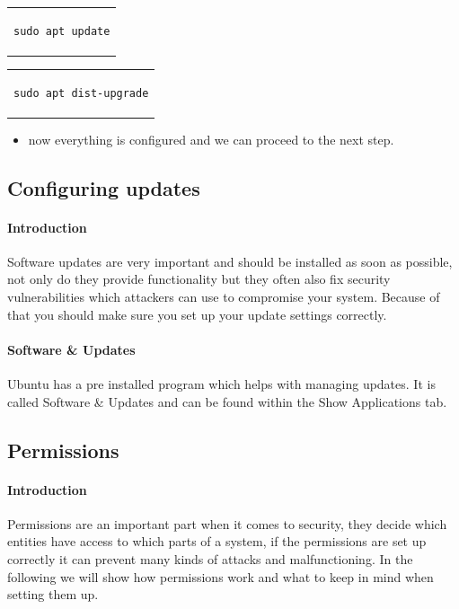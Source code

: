\documentclass[a4paper,10pt]{article}
\begin{document}
\begin{center}
\begin{tabular}{c}
\begin{lstlisting}
sudo apt update
\end{lstlisting}
\end{tabular}
\end{center}

\begin{center}
\begin{tabular}{c}
\begin{lstlisting}
sudo apt dist-upgrade
\end{lstlisting}
\end{tabular}
\end{center}

\begin{itemize}[leftmargin=*]
\item now everything is configured and we can proceed to the next step.
\end{itemize}

\subsection{Configuring updates}
\paragraph{Introduction}
Software updates are very important and should be installed as soon as possible, not only do they provide functionality but they often also fix security vulnerabilities which attackers can use to compromise your system. Because of that you should make sure you set up your update settings correctly.

\paragraph{Software \& Updates}
Ubuntu has a pre installed program which helps with managing updates. It is called Software \& Updates and can be found within the Show Applications tab.



\subsection{Permissions}
\paragraph{Introduction}
Permissions are an important part when it comes to security, they decide which entities have access to which parts of a system, if the permissions are set up correctly it can prevent many kinds of attacks and malfunctioning. In the following we will show how permissions work and what to keep in mind when setting them up.
\end{document}
